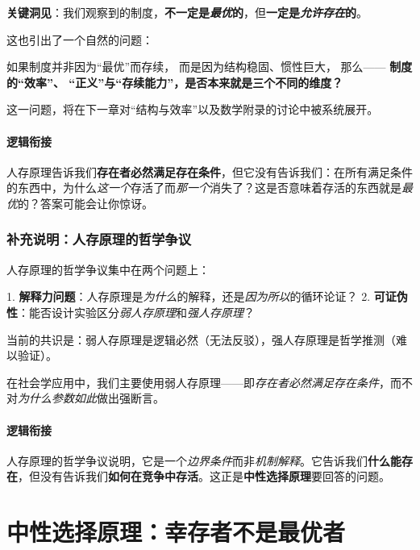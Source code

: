 \documentclass[../main.tex]{subfiles}
\begin{document}
	
	\textbf{\Large 关键洞见}：我们观察到的制度，\textbf{不一定是\textit{最优}的}，但\textbf{一定是\textit{允许存在}的}。
	
	这也引出了一个自然的问题：
	
	如果制度并非因为“最优”而存续，  
	而是因为结构稳固、惯性巨大，  
	那么——  
	\textbf{制度的“效率”、 “正义”与“存续能力”，是否本来就是三个不同的维度？}
	
	这一问题，将在下一章对“结构与效率”以及数学附录的讨论中被系统展开。
	
	

	\paragraph*{逻辑衔接}
	人存原理告诉我们\textbf{存在者必然满足存在条件}，但它没有告诉我们：在所有满足条件的东西中，为什么\textit{这一个}存活了而\textit{那一个}消失了？这是否意味着存活的东西就是\textit{最优}的？答案可能会让你惊讶。

	\subsubsection*{补充说明：人存原理的哲学争议}
	\begin{tcolorbox}[
		colback=gray!5,
		colframe=gray!40,
		title=\small \textit{哲学澄清（可跳过）},
		fonttitle=\bfseries
		]
		\small
		人存原理的哲学争议集中在两个问题上：

		1. \textbf{解释力问题}：人存原理是\textit{为什么}的解释，还是\textit{因为所以}的循环论证？
		2. \textbf{可证伪性}：能否设计实验区分\textit{弱人存原理}和\textit{强人存原理}？

		当前的共识是：弱人存原理是逻辑必然（无法反驳），强人存原理是哲学推测（难以验证）。

		在社会学应用中，我们主要使用弱人存原理——即\textit{存在者必然满足存在条件}，而不对\textit{为什么参数如此}做出强断言。
	\end{tcolorbox}

	\paragraph*{逻辑衔接}
	人存原理的哲学争议说明，它是一个\textit{边界条件}而非\textit{机制解释}。它告诉我们\textbf{什么能存在}，但没有告诉我们\textbf{如何在竞争中存活}。这正是\textbf{中性选择原理}要回答的问题。

	\section{中性选择原理：幸存者不是最优者}
\end{document}
